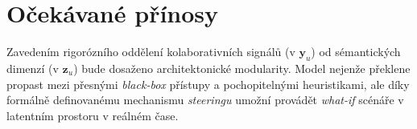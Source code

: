 \section{Očekávané přínosy}
\label{sec:ocekavane_prinosy}
Zavedením rigorózního oddělení kolaborativních signálů (v $\mathbf{y}_u$) od sémantických dimenzí (v $\mathbf{z}_u$) bude dosaženo architektonické modularity. Model nejenže překlene propast mezi přesnými \textit{black-box} přístupy a pochopitelnými heuristikami, ale díky formálně definovanému mechanismu \textit{steeringu} umožní provádět \textit{what-if} scénáře v latentním prostoru v reálném čase.